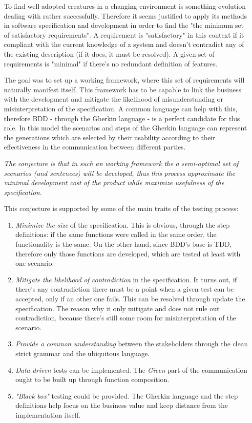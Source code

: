 \documentclass[conference]{IEEEtran}
\begin{document}
To find well adopted creatures in a changing environment is something evolution dealing with rather successfully. Therefore it seems justified to apply its methods in software specification and development in order to find the "the minimum set of satisfactory requirements". A requirement is "satisfactory" in this context if it compliant with the current knowledge of a system and doesn't contradict any of the existing description (if it does, it must be resolved). A given set of requirements is "minimal" if there's no redundant definition of features.

The goal was to set up a working framework, where this set of requirements will naturally manifest itself. This framework has to be capable to link the business with the development and mitigate the likelihood of misunderstanding or misinterpretation of the specification. A common language can help with this, therefore BDD - through the Gherkin language - is a perfect candidate for this role. In this model the scenarios and steps of the Gherkin language can represent the generations which are selected by their usability according to their effectiveness in the communication between different parties.

\textit{The conjecture is that in such an working framework the a semi-optimal set of scenarios (and sentences) will be developed, thus this process approximate the minimal development cost of the product while maximize usefulness of the specification.}

This conjecture is supported by some of the main traits of the testing process:
\begin{enumerate}
    \item \textit{Minimize the size} of the specification. This is obvious, through the step definitions: if the same functions were called in the same order, the functionality is the same. On the other hand, since BDD's base is TDD, therefore only those functions are developed, which are tested at least with one scenario.
    \item \textit{Mitigate the likelihood of contradiction} in the specification. It turns out, if there's any contradiction there must be a point when a given test can be accepted, only if an other one fails. This can be resolved through update the specification. The reason why it only mitigate and does not rule out contradiction, because there's still some room for misinterpretation of the scenario.
    \item \textit{Provide a common understanding} between the stakeholders through the clean strict grammar and the ubiquitous language.
    \item \textit{Data driven} tests can be implemented. The \textit{Given} part of the communication ought to be built up through function composition.
    \item \textit{"Black box"} testing could be provided. The Gherkin language and the step definitions help focus on the business value and keep distance from the implementation itself.
\end{enumerate}
\end{document}

